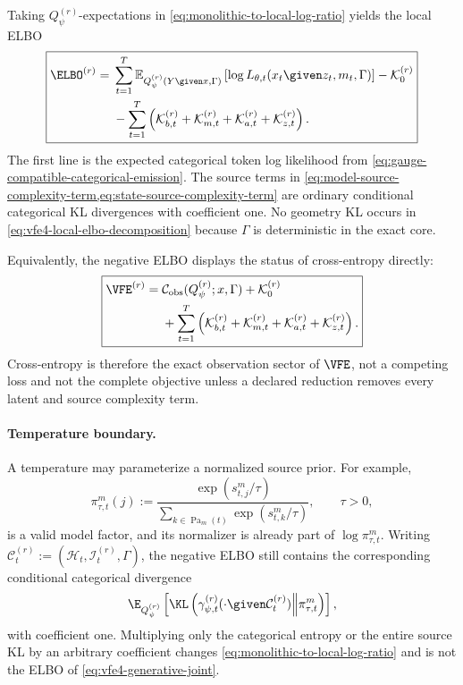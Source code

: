 Taking $Q_\psi^{(r)}$-expectations in \cref{eq:monolithic-to-local-log-ratio} yields the local ELBO
\begin{equation}
\boxed{
\begin{aligned}
\ELBO^{(r)}
={}&\sum_{t=1}^{T}
\mathbb E_{Q_\psi^{(r)}(Y\given x,\Gamma)}
\left[
\log L_{\theta,t}(x_t\given z_t,m_t,\Gamma)
\right]
-\mathcal K_0^{(r)}\\
&-\sum_{t=1}^{T}
\left(
\mathcal K_{b,t}^{(r)}
+\mathcal K_{m,t}^{(r)}
+\mathcal K_{a,t}^{(r)}
+\mathcal K_{z,t}^{(r)}
\right).
\end{aligned}}
\label{eq:vfe4-local-elbo-decomposition}
\end{equation}
The first line is the expected categorical token log likelihood from \cref{eq:gauge-compatible-categorical-emission}. The source terms in \cref{eq:model-source-complexity-term,eq:state-source-complexity-term} are ordinary conditional categorical KL divergences with coefficient one. No geometry KL occurs in \cref{eq:vfe4-local-elbo-decomposition} because $\Gamma$ is deterministic in the exact core.

Equivalently, the negative ELBO displays the status of cross-entropy directly:
\begin{equation}
\boxed{
\begin{aligned}
\VFE^{(r)}
={}&\mathcal C_{\mathrm{obs}}(Q_\psi^{(r)};x,\Gamma)
+\mathcal K_0^{(r)}\\
&+\sum_{t=1}^{T}
\left(
\mathcal K_{b,t}^{(r)}
+\mathcal K_{m,t}^{(r)}
+\mathcal K_{a,t}^{(r)}
+\mathcal K_{z,t}^{(r)}
\right).
\end{aligned}}
\label{eq:vfe4-negative-elbo-ce-plus-complexity}
\end{equation}
Cross-entropy is therefore the exact observation sector of $\VFE$, not a competing loss and not the complete objective unless a declared reduction removes every latent and source complexity term.

\paragraph{Temperature boundary.}
A temperature may parameterize a normalized source prior. For example,
\begin{equation}
\pi_{\tau,t}^{m}(j)
:=\frac{\exp(s_{t,j}^{m}/\tau)}
{\sum_{k\in\operatorname{Pa}_m(t)}\exp(s_{t,k}^{m}/\tau)},
\qquad \tau>0,
\label{eq:temperature-parameterized-source-prior}
\end{equation}
is a valid model factor, and its normalizer is already part of $\log\pi_{\tau,t}^{m}$. Writing
$\mathcal C_t^{(r)}:=(\mathcal H_t,\mathcal I_t^{(r)},\Gamma)$,
the negative ELBO still contains the corresponding conditional categorical divergence
\[
\E_{Q_\psi^{(r)}}\left[
\KL\left(
\gamma_{\psi,t}^{(r)}(\mathord{\cdot}\given\mathcal C_t^{(r)})
\middle\Vert
\pi_{\tau,t}^{m}
\right)
\right],
\]
with coefficient one. Multiplying only the categorical entropy or the entire source KL by an arbitrary coefficient changes \cref{eq:monolithic-to-local-log-ratio} and is not the ELBO of \cref{eq:vfe4-generative-joint}.

